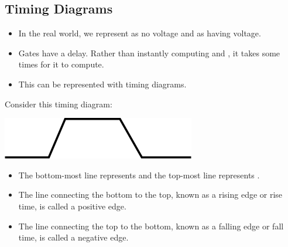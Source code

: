 \documentclass[letterpaper]{article}
\begin{document}
\subsection{Timing Diagrams}
\begin{itemize}
    \item In the real world, we represent  as no voltage and  as having voltage. 
    \item Gates have a delay. Rather than instantly computing  and , it takes some times for it to compute. 
    \item This can be represented with timing diagrams. 
\end{itemize}
Consider this timing diagram:
\begin{center}
    \includegraphics[scale=0.6]{img/timing_diagram.PNG}
\end{center}
\begin{itemize}
    \item The bottom-most line represents  and the top-most line represents .
    \item The line connecting the bottom to the top, known as a rising edge or rise time, is called a positive edge. 
    \item The line connecting the top to the bottom, known as a falling edge or fall time, is called a negative edge.   
\end{itemize}
\end{document}
